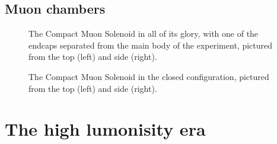 \subsection{Muon chambers}
\begin{figure}[htb]
    \centering
    \quad
    \caption{
        The Compact Muon Solenoid in all of its glory, with one of the endcaps separated from the main body of the experiment, pictured from the top (left) and side (right). 
    }
    \label{fig:cms_pics}
\end{figure}

\begin{figure}[htb]
    \centering
    \quad
    \caption{
        The Compact Muon Solenoid in the closed configuration, pictured from the top (left) and side (right).
    }
    \label{fig:cms_jguiang}
\end{figure}
\section{The high lumonisity era}
